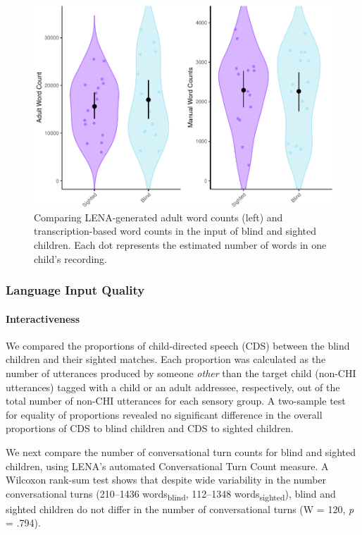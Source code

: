 \documentclass[
  man]{apa6}
\let\oldparagraph\paragraph
\renewcommand{\paragraph}[1]{\oldparagraph{#1}\mbox{}}
\begin{document}
\begin{figure}
\centering
\includegraphics{input_quality_manuscript_files/figure-latex/quantity-plots-1.pdf}
\caption{\label{fig:quantity-plots}Comparing LENA-generated adult word counts (left) and transcription-based word counts in the input of blind and sighted children. Each dot represents the estimated number of words in one child's recording.}
\end{figure}

\hypertarget{language-input-quality}{%
\subsubsection{Language Input Quality}\label{language-input-quality}}

\hypertarget{interactiveness}{%
\paragraph{Interactiveness}\label{interactiveness}}

We compared the proportions of child-directed speech (CDS) between the blind children and their sighted matches. Each proportion was calculated as the number of utterances produced by someone \emph{other} than the target child (non-CHI utterances) tagged with a child or an adult addressee, respectively, out of the total number of non-CHI utterances for each sensory group. A two-sample test for equality of proportions revealed no significant difference in the overall proportions of CDS to blind children and CDS to sighted children.

We next compare the number of conversational turn counts for blind and sighted children, using LENA's automated Conversational Turn Count measure. A Wilcoxon rank-sum test shows that despite wide variability in the number conversational turns (210--1436 words\textsubscript{blind}, 112--1348 words\textsubscript{sighted}), blind and sighted children do not differ in the number of conversational turns (W = 120, \emph{p} = .794).
\end{document}
